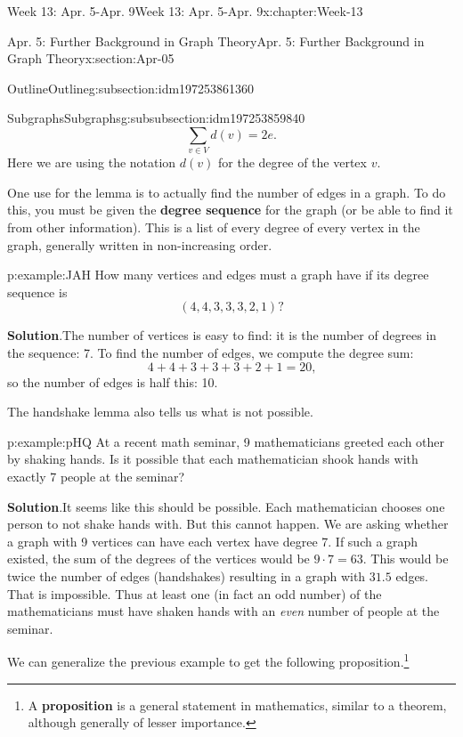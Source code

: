\documentclass[oneside,10pt,]{book}
\newcommand{\blocktitlefont}{\relax}
\newcommand{\terminology}[1]{\textbf{#1}}
\numberwithin{equation}{section}
\begin{document}
\begin{chapterptx}{Week 13: Apr. 5-Apr. 9}{}{Week 13: Apr. 5-Apr. 9}{}{}{x:chapter:Week-13}
\begin{sectionptx}{Apr. 5: Further Background in Graph Theory}{}{Apr. 5: Further Background in Graph Theory}{}{}{x:section:Apr-05}
\begin{subsectionptx}{Outline}{}{Outline}{}{}{g:subsection:idm197253861360}
\begin{subsubsectionptx}{Subgraphs}{}{Subgraphs}{}{}{g:subsubsection:idm197253859840}
\begin{equation*}
\sum_{v\in V} d(v) = 2e\text{.}
\end{equation*}
Here we are using the notation \(d(v)\) for the degree of the vertex \(v\).%
\par
{} One use for the lemma is to actually find the number of edges in a graph.  To do this, you must be given the \terminology{degree sequence} for the graph (or be able to find it from other information).  This is a list of every degree of every vertex in the graph, generally written in non-increasing order.%
\begin{example}{}{p:example:JAH}%
How many vertices and edges must a graph have if its degree sequence is%
\begin{equation*}
(4, 4, 3, 3, 3, 2, 1)\text{?}
\end{equation*}
%
\par\smallskip%
\noindent\textbf{\blocktitlefont Solution}.\hypertarget{p:solution:PZN}{}\quad{}The number of vertices is easy to find: it is the number of degrees in the sequence: 7.  To find the number of edges, we compute the degree sum:%
\begin{equation*}
4 + 4 + 3 + 3 + 3 + 2 + 1 = 20\text{,}
\end{equation*}
so the number of edges is half this: 10.%
\end{example}
The handshake lemma also tells us what is not possible.%
\begin{example}{}{p:example:pHQ}%
At a recent math seminar, 9 mathematicians greeted each other by shaking hands. Is it possible that each mathematician shook hands with exactly 7 people at the seminar?%
\par\smallskip%
\noindent\textbf{\blocktitlefont Solution}.\hypertarget{p:solution:wgW}{}\quad{}It seems like this should be possible. Each mathematician chooses one person to not shake hands with. But this cannot happen. We are asking whether a graph with 9 vertices can have each vertex have degree 7. If such a graph existed, the sum of the degrees of the vertices would be \(9\cdot 7 = 63\). This would be twice the number of edges (handshakes) resulting in a graph with \(31.5\) edges. That is impossible. Thus at least one (in fact an odd number) of the mathematicians must have shaken hands with an \emph{even} number of people at the seminar.%
\end{example}
We can generalize the previous example to get the following proposition.\footnote{A \terminology{proposition} is a general statement in mathematics, similar to a theorem, although generally of lesser importance.\label{g:fn:idm197253807248}}%

\end{subsubsectionptx}
\end{subsectionptx}
\end{sectionptx}
\end{chapterptx}
\end{document}
